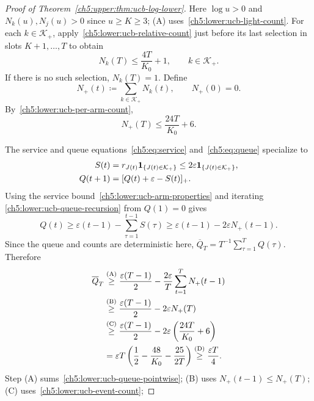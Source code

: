 \begin{proof}[Proof of Theorem~\ref{ch5:upper:thm:ucb-log-lower}]
Here $\log u>0$ and $N_k(u),N_j(u)>0$ since $u\ge K\ge3$;
(A) uses~\eqref{ch5:lower:ucb-light-count}.
For each $k\in\mathcal K_+$, apply~\eqref{ch5:lower:ucb-relative-count}
just before its last selection in slots $K+1,\ldots,T$ to obtain
\begin{equation}
 N_k(T)\le\frac{4T}{K_0}+1,\qquad k\in\mathcal K_+.
 \label{ch5:lower:ucb-per-arm-count}
\end{equation}
If there is no such selection, $N_k(T)=1$.
Define
\[
 N_+(t)\coloneqq\sum_{k\in\mathcal K_+}N_k(t),\qquad N_+(0)=0.
\]
By~\eqref{ch5:lower:ucb-per-arm-count},
\begin{equation}
 N_+(T)\le\frac{24T}{K_0}+6.
 \label{ch5:lower:ucb-event-count}
\end{equation}

The service and queue equations~\eqref{ch5:eq:service}
and~\eqref{ch5:eq:queue} specialize to
\begin{equation}
\begin{aligned}
 S(t)&=r_{J(t)}\mathbf{1}_{\{J(t)\in\mathcal K_+\}}
       \le2\varepsilon\mathbf{1}_{\{J(t)\in\mathcal K_+\}},\\
 Q(t+1)&=[Q(t)+\varepsilon-S(t)]_+.
\end{aligned}
\label{ch5:lower:ucb-queue-recursion}
\end{equation}
Using the service bound~\eqref{ch5:lower:ucb-arm-properties} and iterating
\eqref{ch5:lower:ucb-queue-recursion} from $Q(1)=0$ gives
\begin{equation}
 Q(t)\ge\varepsilon(t-1)-\sum_{\tau=1}^{t-1}S(\tau)
       \ge\varepsilon(t-1)-2\varepsilon N_+(t-1).
 \label{ch5:lower:ucb-queue-pointwise}
\end{equation}
Since the queue and counts are deterministic here,
$\overline Q_T=T^{-1}\sum_{\tau=1}^T Q(\tau)$. Therefore
\begin{align}
\overline Q_T
 &\overset{\mathrm{(A)}}{\ge}\frac{\varepsilon(T-1)}2
 -\frac{2\varepsilon}{T}\sum_{t=1}^{T}N_+(t-1)\notag\\
 &\overset{\mathrm{(B)}}{\ge}\frac{\varepsilon(T-1)}2-2\varepsilon N_+(T)\notag\\
 &\overset{\mathrm{(C)}}{\ge}\frac{\varepsilon(T-1)}2
       -2\varepsilon\left(\frac{24T}{K_0}+6\right)\notag\\
&=\varepsilon T\left(\frac12-\frac{48}{K_0}-\frac{25}{2T}\right)
 \overset{\mathrm{(D)}}{\ge}\frac{\varepsilon T}{4}.
\label{ch5:lower:ucb-queue-K-bound}
\end{align}
Step (A) sums~\eqref{ch5:lower:ucb-queue-pointwise};
(B) uses $N_+(t-1)\le N_+(T)$; (C) uses~\eqref{ch5:lower:ucb-event-count};

\end{proof}
